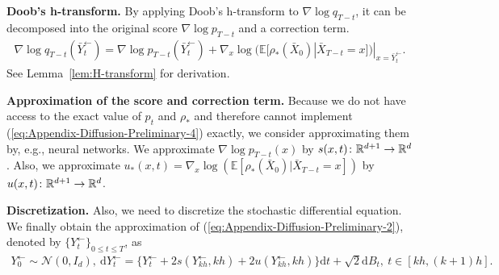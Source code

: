
{\bf Doob's h-transform.} 
By applying Doob's h-transform to $\nabla \log q_{T-t}$, it can be decomposed into the original score $\nabla\log p_{T-t}$ and a correction term.
\begin{align}
    \nabla \log q_{T-t}(\bar{Y}_{t}^\leftarrow) = \nabla\log p_{T-t}(\bar{Y}_{t}^\leftarrow) + \nabla_x \log (\mathbb{E}[\rho_*(\bar{X}_0)|\bar{X}_{T-t}=x])|_{x=\bar{Y}_{t}^\leftarrow}.
    \label{eq:Appendix-Diffusion-Preliminary-4}
\end{align}
See Lemma~\ref{lem:H-transform} for derivation.

{\bf Approximation of the score and correction term.} 
Because we do not have access to the exact value of $p_{t}$ and $\rho_*$ and therefore cannot implement (\ref{eq:Appendix-Diffusion-Preliminary-4}) exactly, we consider approximating them by, e.g., neural networks.
We approximate $\nabla \log p_{T-t}(x)$ by $s(x,t)\colon \mathbb{R}^{d+1}\to \mathbb{R}^d$.
Also, we approximate
$u_*(x,t)=\nabla_x \log (\mathbb{E}[\rho_*(\bar{X}_0)|\bar{X}_{T-t}=x])$ by $u(x,t)\colon \mathbb{R}^{d+1}\to \mathbb{R}^d$.

{\bf Discretization.} 
Also, we need to discretize the stochastic differential equation.
We finally obtain the approximation of (\ref{eq:Appendix-Diffusion-Preliminary-2}), denoted by $\{ Y^\leftarrow_t\}_{0\leq t \leq T}$, as
\begin{align}
    Y^\leftarrow_0 \sim \mathcal{N}(0,I_d),\ 
    \mathrm{d} Y^\leftarrow_t = \{ Y^\leftarrow_t + 2s( Y^\leftarrow_{kh},kh)+2u( Y^\leftarrow_{kh},kh)\}\mathrm{d}t + \sqrt{2}\mathrm{d}B_t,\ t\in [kh,(k+1)h].
    \label{eq:Appendix-Diffusion-Preliminary-5}
\end{align}


